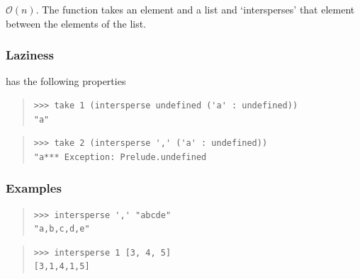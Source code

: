 \begin{haddockdesc}
\item[\begin{tabular}{@{}l}
intersperse :: a -> {\char 91}a{\char 93} -> {\char 91}a{\char 93}
\end{tabular}]
{\haddockbegindoc
\(\mathcal{O}(n)\). The  function takes an element and a list
 and `intersperses' that element between the elements of the list.\par
\subsubsection*{\textbf{Laziness}}
 has the following properties\par
\begin{quote}
{\haddockverb\begin{verbatim}
>>> take 1 (intersperse undefined ('a' : undefined))
"a"

\end{verbatim}}
\end{quote}
\begin{quote}
{\haddockverb\begin{verbatim}
>>> take 2 (intersperse ',' ('a' : undefined))
"a*** Exception: Prelude.undefined

\end{verbatim}}
\end{quote}
\subsubsection*{\textbf{Examples}}
\begin{quote}
{\haddockverb\begin{verbatim}
>>> intersperse ',' "abcde"
"a,b,c,d,e"

\end{verbatim}}
\end{quote}
\begin{quote}
{\haddockverb\begin{verbatim}
>>> intersperse 1 [3, 4, 5]
[3,1,4,1,5]

\end{verbatim}}
\end{quote}}
\end{haddockdesc}
